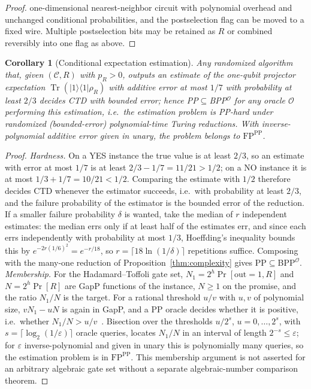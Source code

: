 \documentclass[aps,prx,reprint,superscriptaddress,nobibnotes,longbibliography]{revtex4-2}
\newtheorem{corollary}{Corollary}
\theoremstyle{remark}
\newcommand{\Tr}{\operatorname{Tr}}
\begin{document}
\begin{proof}
one-dimensional nearest-neighbor circuit with polynomial overhead and unchanged conditional probabilities, and the postselection flag can be moved to a fixed wire.  Multiple postselection bits may be retained as $R$ or combined reversibly into one flag as above.
\end{proof}

\begin{corollary}[Conditional expectation estimation]
Any randomized algorithm that, given $(\mathcal C,R)$ with $p_R>0$, outputs an estimate of the one-qubit projector expectation $\Tr(|1\rangle\langle1|\rho_R)$ with additive error at most $1/7$ with probability at least $2/3$ decides CTD with bounded error; hence PP$\subseteq$BPP$^{\mathcal O}$ for any oracle $\mathcal O$ performing this estimation, i.e.\ the estimation problem is PP-hard under randomized (bounded-error) polynomial-time Turing reductions.  With inverse-polynomial additive error given in unary, the problem belongs to $\mathrm{FP}^{\mathrm{PP}}$.
\end{corollary}

\begin{proof}
\emph{Hardness.}  On a YES instance the true value is at least $2/3$, so an estimate with error at most $1/7$ is at least $2/3-1/7=11/21>1/2$; on a NO instance it is at most $1/3+1/7=10/21<1/2$.  Comparing the estimate with $1/2$ therefore decides CTD whenever the estimator succeeds, i.e.\ with probability at least $2/3$, and the failure probability of the estimator is the bounded error of the reduction.  If a smaller failure probability $\delta$ is wanted, take the median of $r$ independent estimates: the median errs only if at least half of the estimates err, and since each errs independently with probability at most $1/3$, Hoeffding's inequality bounds this by $e^{-2r(1/6)^2}=e^{-r/18}$, so $r=\lceil18\ln(1/\delta)\rceil$ repetitions suffice.  Composing with the many-one reduction of Proposition~\ref{thm:complexity} gives PP$\subseteq$BPP$^{\mathcal O}$.  \emph{Membership.}  For the Hadamard--Toffoli gate set, $N_1=2^h\Pr[\mathrm{out}=1,R]$ and $N=2^h\Pr[R]$ are GapP functions of the instance, $N\ge1$ on the promise, and the ratio $N_1/N$ is the target.  For a rational threshold $u/v$ with $u,v$ of polynomial size, $vN_1-uN$ is again in GapP, and a PP oracle decides whether it is positive, i.e.\ whether $N_1/N>u/v$~\cite{Fenner1994}.  Bisection over the thresholds $u/2^s$, $u=0,\ldots,2^s$, with $s=\lceil\log_2(1/\varepsilon)\rceil$ oracle queries, locates $N_1/N$ in an interval of length $2^{-s}\le\varepsilon$; for $\varepsilon$ inverse-polynomial and given in unary this is polynomially many queries, so the estimation problem is in $\mathrm{FP}^{\mathrm{PP}}$.  This membership argument is not asserted for an arbitrary algebraic gate set without a separate algebraic-number comparison theorem.
\end{proof}
\end{document}
